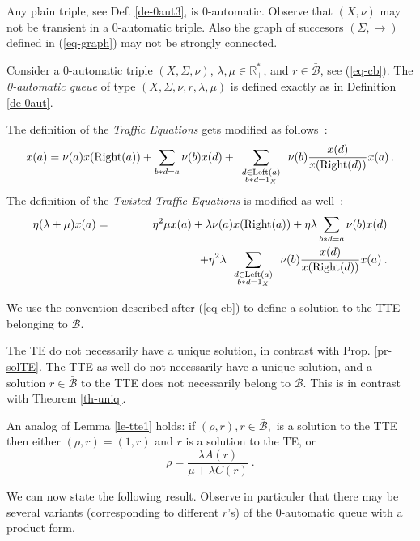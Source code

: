 \documentclass[11pt,a4paper]{article}
\newcommand{\bdl}[2]
{\mbox{$
\renewcommand{\arraystretch}{0.5}
\begin{array}{c}{\scriptstyle #1}\\ {\scriptstyle #2} \end{array}
\renewcommand{\arraystretch}{2}
       $}}
\theoremstyle{remark}
\def\Blackboardfont{\mathbb}
\def\leftt{\text{Left}}
\def\rightt{\text{Right}}
\def\cb{\cB}
\def\closcb{\bar{\cB}}
\def\R{{\Blackboardfont R}}
\def\cB{{\mathcal B}}
\def\eref#1{(\ref{#1})}
\begin{document}
Any plain triple, see Def. \ref{de-0aut3}, is 0-automatic. 
Observe that $(X,\nu)$ may not be transient in a 0-automatic
triple. Also the graph of succesors $(\Sigma,\rightarrow)$ defined in
\eref{eq-graph} may not be strongly connected. 

\medskip

Consider a 0-automatic triple $(X,\Sigma,\nu)$,  $\lambda, \mu \in
\R_+^*$, and  $r \in \closcb$, see \eref{eq-cb}. 
The {\em 0-automatic queue} of type $(X,\Sigma,\nu,r,\lambda,\mu)$ is
defined exactly as in Definition \ref{de-0aut}. 

The definition of the {\em Traffic Equations} gets modified as
follows~:
\begin{equation}\label{eq-TE2}
x(a)  =  \nu(a)x(\rightt(a)) + \sum_{b\ast d = a} \nu(b)x(d)  +
\sum_{\bdl{d\in \leftt(a)}{b\ast d=1_X}} \nu(b)
\frac{x(d)}{x(\rightt(d))} x(a) \:.
\end{equation}
The definition of the {\em Twisted Traffic Equations} is modified as well~:
\begin{eqnarray}\label{eq-TTE2}
\eta (\lambda+\mu) x(a) & = & \eta^2 \mu x(a) + \lambda \nu(a)
x(\rightt(a) ) + \eta\lambda \sum_{b \ast d=a} \nu(b)x(d)
\\
& & \hspace*{2.5cm} + \eta^2 \lambda \sum_{\bdl{d\in
\leftt(a)}{b\ast d=1_X}} \nu(b) \frac{x(d)}{x(\rightt(d))} x(a)
\:.\nonumber
\end{eqnarray}


We use the convention described after
\eref{eq-cb} to define a solution to the TTE belonging to $\closcb$.

The TE do not necessarily have a unique solution, in
contrast with
Prop. \ref{pr-solTE}.
The TTE as well do not necessarily have a unique solution, and a 
solution $r\in \closcb$ to the TTE does not necessarily belong to
$\cb$. This is in contrast with Theorem \ref{th-uniq}. 

An analog of Lemma \ref{le-tte1} holds: if $(\rho,r), r\in \closcb,$ is a
solution to the TTE then either $(\rho,r)=(1,r)$ and $r$ is a solution
to the TE, or
\begin{equation}\label{eq-etax2}
\rho= \frac{\lambda A(r)}{\mu + \lambda C(r)}\:.
\end{equation}

We can now state the following result. Observe in particuler that
there may be several variants (corresponding to different $r$'s) of
the 0-automatic queue with a product form. 
\end{document}
